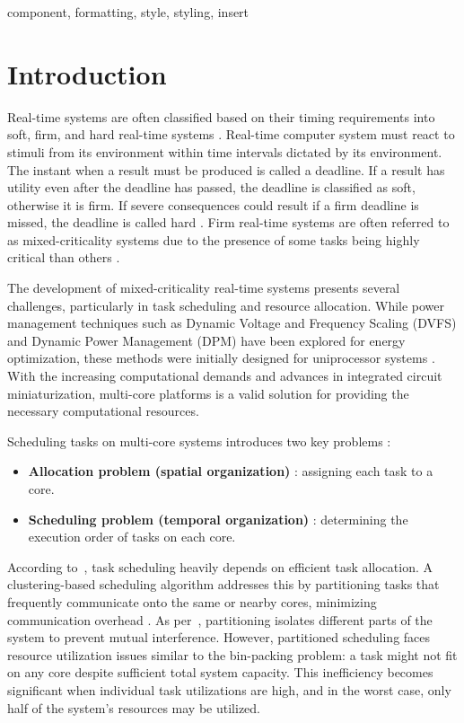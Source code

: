 \documentclass[conference]{IEEEtran}
\begin{document}
\begin{IEEEkeywords}
component, formatting, style, styling, insert
\end{IEEEkeywords}

\section{Introduction}
Real-time systems are often classified based on their timing requirements into soft, firm, and hard real-time systems \cite{6122386}.  Real-time computer system must react to stimuli from its environment within time intervals dictated by its environment. The instant when a result must be produced is called a deadline. If a result has utility even after the deadline has passed, the deadline is classified as soft, otherwise it is firm. If severe consequences could result if a firm deadline is missed, the deadline is called hard \cite{kopetzDist}. Firm real-time systems are often referred to as mixed-criticality systems due to the presence of some tasks being highly critical than others \cite{zamora2013}.

The development of mixed-criticality real-time systems presents several challenges, particularly in task scheduling and resource allocation. While power management techniques such as Dynamic Voltage and Frequency Scaling (DVFS) and Dynamic Power Management (DPM) have been explored for energy optimization, these methods were initially designed for uniprocessor systems \cite{6122386}. With the increasing computational demands and advances in integrated circuit miniaturization, multi-core platforms is a valid solution for providing the necessary computational resources.

Scheduling tasks on multi-core systems introduces two key problems \cite{AbdallahGB24}:
\begin{itemize}
    \item \textbf{Allocation problem (spatial organization)} : assigning each task to a core.
    \item \textbf{Scheduling problem (temporal organization)} : determining the execution order of tasks on each core.
\end{itemize}

According to~\cite{7832222}, task scheduling heavily depends on efficient task allocation. A clustering-based scheduling algorithm addresses this by partitioning tasks that frequently communicate onto the same or nearby cores, minimizing communication overhead \cite{AbdallahGB24}. As per~\cite{zamora2013}, partitioning isolates different parts of the system to prevent mutual interference. However, partitioned scheduling faces resource utilization issues similar to the bin-packing problem: a task might not fit on any core despite sufficient total system capacity. This inefficiency becomes significant when individual task utilizations are high, and in the worst case, only half of the system’s resources may be utilized.
\end{document}
